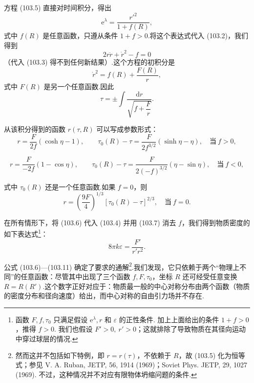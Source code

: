 方程 (103.5) 直接对时间积分，得出
\begin{equation}
  \mathrm{e}^{\lambda}=\frac{r'^{2}}{1+f(R)},
\end{equation}
式中 $f(R)$ 是任意函数，只遵从条件 $1+f>0$.将这个表达式代入 (103.2)，我们得到
\begin{equation*}
  2r\ddot{r}+\dot{r}^{2}-f=0
\end{equation*}
（代入 (103.3) 得不到任何新结果）.这个方程的初积分是
\begin{equation}
  \dot{r}^{2}=f(R)+\frac{F(R)}{r},
\end{equation}
式中 $F(R)$ 是另一个任意函数.因此
\begin{equation*}
  \tau=\pm\int\frac{\mathrm{d}r}
  {\sqrt{f+\dfrac{F}{r}}}.
\end{equation*}

从该积分得到的函数 $r(\tau,R)$ 可以写成参数形式：
\begin{equation}
  r=\frac{F}{2f}(\cosh\eta-1),\qquad
  \tau_0(R)-\tau=\frac{F}{2f^{3/2}}(\sinh\eta-\eta),
  \quad\text{当}\ f>0,
\end{equation}

\begin{equation}
  r=\frac{F}{-2f}(1-\cos\eta),\qquad
  \tau_0(R)-\tau=\frac{F}{2(-f)^{3/2}}(\eta-\sin\eta),
  \quad\text{当}\ f<0,
\end{equation}

式中 $\tau_0(R)$ 还是一个任意函数.如果 $f=0$，则
\begin{equation}
  r=\left(\frac{9F}{4}\right)^{1/3}
  \left[\tau_0(R)-\tau\right]^{2/3},
  \quad\text{当}\ f=0.
\end{equation}

在所有情形下，将 (103.6) 代入 (103.4) 并用 (103.7) 消去 $f$，我们得到物质密度的如下表达式\footnote{函数 $F,f,\tau_{0}$ 只满足假设 $\mathrm{e}^{\lambda},r$ 和 $\varepsilon$ 的正性条件. 加上上面给出的条件 $1+f>0$，推得 $f>0$. 我们也假设 $F'>0,\ r'>0$；这就排除了导致物质在其径向运动中穿过球层的情况.}：
\begin{equation}
  8\pi k\varepsilon=\frac{F'}{r'r^{2}}.
\end{equation}

公式 (103.6)—(103.11) 确定了要求的通解\footnote{然而这并不包括如下特例，即 $r=r(\tau)$，不依赖于 $R$，故 (103.5) 化为恒等式；参见 V. A. Ruban, JETP, 56, 1914 (1969)；Soviet Phys. JETP, 29, 1027 (1969). 不过，这种情况并不对应有限物体坍缩问题的条件.}.我们发现，它只依赖于两个“物理上不同”的任意函数：尽管其中出现了三个函数 $f,F,\tau_0$，坐标 $R$ 还可经受任意变换 $R=R(R')$.这个数字正好对应于：物质最一般的中心对称分布由两个函数（物质的密度分布和径向速度）给出，而中心对称的自由引力场并不存在.

